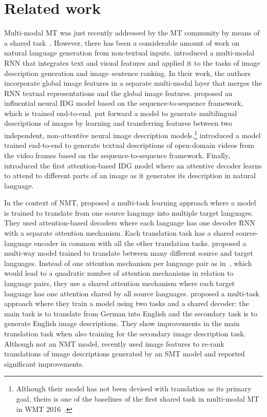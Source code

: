 \documentclass[11pt]{article}
\begin{document}
\section{Related work}
\label{sec:related}

Multi-modal MT was just recently addressed by the MT community by means of a shared task~\cite{Speciaetal2016}.
However, there has been a considerable amount of work on natural language generation from non-textual inputs.
 introduced a multi-modal RNN that integrates text and visual features and applied it to the tasks of image description generation and image--sentence ranking.
In their work, the authors incorporate global image features in a separate multi-modal layer that merges the RNN textual representations and the global image features.
 proposed an influential neural IDG model based on the sequence-to-sequence framework, which is trained end-to-end.
 put forward a model to generate multilingual descriptions of images by learning and transferring features between two independent, non-attentive neural image description models.\footnote{Although their model has not been devised with translation as its primary goal, theirs is one of the baselines of the first shared task in multi-modal MT in WMT 2016~\cite{Speciaetal2016}.}
 introduced a model trained end-to-end to generate textual descriptions of open-domain videos from the video frames based on the sequence-to-sequence framework.
Finally,  introduced the first attention-based IDG model where an attentive decoder learns to attend to different parts of an image as it generates its description in natural language.

In the context of NMT,  proposed a multi-task learning approach where a model is trained to translate from one source language into multiple target languages.
They used attention-based decoders where each language has one decoder RNN with a separate attention mechanism.
Each translation task has a shared source-language encoder in common with all the other translation tasks.
 proposed a multi-way model trained to translate between many different source and target languages.
Instead of one attention mechanism per language pair as in~, which would lead to a quadratic number of attention mechanisms in relation to language pairs, they use a shared attention mechanism where each target language has one attention shared by all source languages.
 proposed a multi-task approach where they train a model using two tasks and a shared decoder: the main task is to translate from German into English and the secondary task is to generate English image descriptions.
They show improvements in the main translation task when also training for the secondary image description task.
Although not an NMT model,  recently used image features to re-rank translations of image descriptions generated by an SMT model and reported significant improvements.
\end{document}
